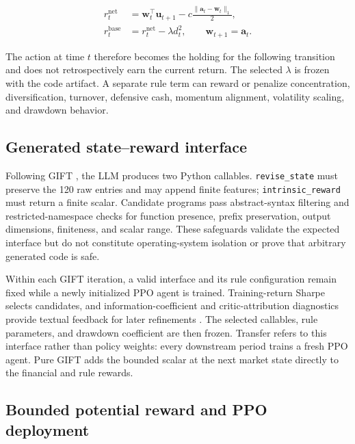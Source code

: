 \documentclass[pdflatex,sn-basic,Numbered]{sn-jnl}
\begin{document}
\[
\begin{aligned}
r^{\mathrm{net}}_t&=\mathbf{w}_t^\top\mathbf{u}_{t+1}
-c\frac{\lVert\mathbf{a}_t-\mathbf{w}_t\rVert_1}{2},\\
r_t^{\mathrm{base}}&=r_t^{\mathrm{net}}-\lambda d_t^2,
\qquad \mathbf{w}_{t+1}=\mathbf{a}_t .
\end{aligned}
\]

The action at time \(t\) therefore becomes the holding for the following transition and does not retrospectively earn the current return. The selected \(\lambda\) is frozen with the code artifact. A separate rule term can reward or penalize concentration, diversification, turnover, defensive cash, momentum alignment, volatility scaling, and drawdown behavior.

\hypertarget{generated-statereward-interface}{%
\subsection{Generated state--reward interface}\label{generated-statereward-interface}}

Following GIFT \cite{ref29}, the LLM produces two Python callables. \texttt{revise\_state} must preserve the 120 raw entries and may append finite features; \texttt{intrinsic\_reward} must return a finite scalar. Candidate programs pass abstract-syntax filtering and restricted-namespace checks for function presence, prefix preservation, output dimensions, finiteness, and scalar range. These safeguards validate the expected interface but do not constitute operating-system isolation or prove that arbitrary generated code is safe.

Within each GIFT iteration, a valid interface and its rule configuration remain fixed while a newly initialized PPO agent is trained. Training-return Sharpe selects candidates, and information-coefficient and critic-attribution diagnostics provide textual feedback for later refinements \cite{ref29}. The selected callables, rule parameters, and drawdown coefficient are then frozen. Transfer refers to this interface rather than policy weights: every downstream period trains a fresh PPO agent. Pure GIFT adds the bounded scalar at the next market state directly to the financial and rule rewards.

\hypertarget{bounded-potential-reward-and-ppo-deployment}{%
\subsection{Bounded potential reward and PPO deployment}\label{bounded-potential-reward-and-ppo-deployment}}
\end{document}
